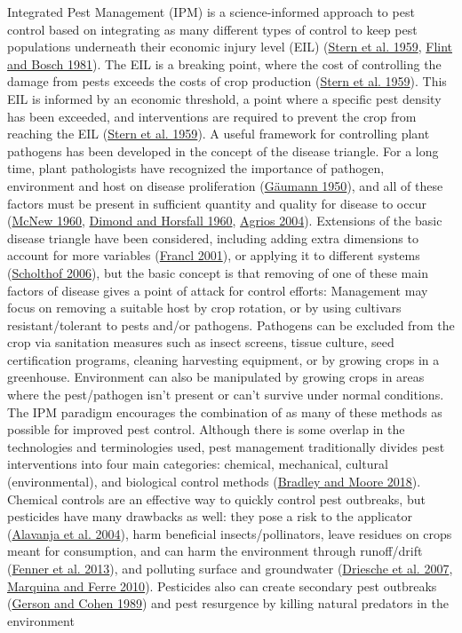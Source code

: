 \documentclass{ufdissertation}[overrideChapters] %
\begin{document}
{Integrated Pest Management (IPM) is a science-informed approach to pest control based on integrating as many different types of control to keep pest populations underneath their economic injury level (EIL) (\protect\hyperlink{ref-Stern1959}{Stern et al. 1959}, \protect\hyperlink{ref-Flint1981}{Flint and Bosch 1981}). The EIL is a breaking point, where the cost of controlling the damage from pests exceeds the costs of crop production (\protect\hyperlink{ref-Stern1959}{Stern et al. 1959}). This EIL is informed by an economic threshold, a point where a specific pest density has been exceeded, and interventions are required to prevent the crop from reaching the EIL (\protect\hyperlink{ref-Stern1959}{Stern et al. 1959}). A useful framework for controlling plant pathogens has been developed in the concept of the disease triangle. For a long time, plant pathologists have recognized the importance of pathogen, environment and host on disease proliferation (\protect\hyperlink{ref-Gaeumann1950}{Gäumann 1950}), and all of these factors must be present in sufficient quantity and quality for disease to occur (\protect\hyperlink{ref-McNew1960}{McNew 1960}, \protect\hyperlink{ref-Stevens1960}{Dimond and Horsfall 1960}, \protect\hyperlink{ref-Agrios2004}{Agrios 2004}). Extensions of the basic disease triangle have been considered, including adding extra dimensions to account for more variables (\protect\hyperlink{ref-Francl2001}{Francl 2001}), or applying it to different systems (\protect\hyperlink{ref-Scholthof2006}{Scholthof 2006}), but the basic concept is that removing of one of these main factors of disease gives a point of attack for control efforts: Management may focus on removing a suitable host by crop rotation, or by using cultivars resistant/tolerant to pests and/or pathogens. Pathogens can be excluded from the crop via sanitation measures such as insect screens, tissue culture, seed certification programs, cleaning harvesting equipment, or by growing crops in a greenhouse. Environment can also be manipulated by growing crops in areas where the pest/pathogen isn't present or can't survive under normal conditions. The IPM paradigm encourages the combination of as many of these methods as possible for improved pest control. Although there is some overlap in the technologies and terminologies used, pest management traditionally divides pest interventions into four main categories: chemical, mechanical, cultural (environmental), and biological control methods (\protect\hyperlink{ref-Bradley2018}{Bradley and Moore 2018}). Chemical controls are an effective way to quickly control pest outbreaks, but pesticides have many drawbacks as well: they pose a risk to the applicator (\protect\hyperlink{ref-Alavanja2004}{Alavanja et al. 2004}), harm beneficial insects/pollinators, leave residues on crops meant for consumption, and can harm the environment through runoff/drift (\protect\hyperlink{ref-Fenner2013}{Fenner et al. 2013}), and polluting surface and groundwater (\protect\hyperlink{ref-Driesche2007}{Driesche et al. 2007}, \protect\hyperlink{ref-Marquina2010}{Marquina and Ferre 2010}). Pesticides also can create secondary pest outbreaks (\protect\hyperlink{ref-Gerson1989}{Gerson and Cohen 1989}) and pest resurgence by killing natural predators in the environment }
\end{document}
